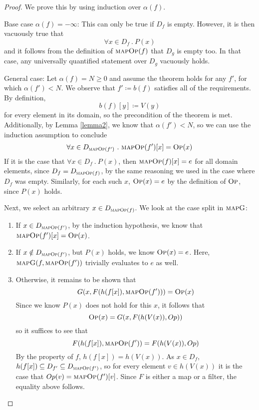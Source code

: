 \documentclass{article}
\newcommand{\iteDef}[4]{
  #1 \coloneqq \left\{
\begin{array}{ll}
      #2 &; #3 \\
      #4 &; \text{otherwise}\\
\end{array} 
\right. 
}
\newcommand{\op}{\textsc{Op}}
\newcommand{\mop}{\textsc{mapOp}}
\newcommand{\mapg}{\textsc{mapG}}
\begin{document}
\begin{proof}
We prove this by using induction over $\alpha(f)$.

Base case $\alpha(f) = -\infty$: This can only be true if $D_f$ is empty. However, it is then vacuously true that 
\[
\forall x \in D_f \ .\ P(x)
\]
and it follows from the definition of $\mop(f)$ that $D_g$ is empty too. In that case, any universally quantified statement over $D_g$ vacuously holds.

General case: Let $\alpha(f) = N \ge 0$ and assume the theorem holds for any $f'$, for which $\alpha(f') < N$.
We observe that $f' \coloneqq b(f)$ satisfies all of the requirements. By definition, 
\[
b(f)[y] \coloneqq V(y)
\]
for every element in its domain, so the precondition of the theorem is met. Additionally, by Lemma \ref{lemma2}, we know that $\alpha(f') < N$, so we can use the induction assumption to conclude 
\[
\forall x \in D_{\mop(f')} \ .\ \mop(f')[x] = \op(x)
\]
If it is the case that $\forall x \in D_f \ .\ P(x)$, then $\mop(f)[x] = e$ for all domain elements, since 
$D_f = D_{\mop(f)}$, by the same reasoning we used in the case where $D_f$ was empty. Similarly, for each such $x$, $\op(x) = e$ by the definition of $\op$, since $P(x)$ holds.

Next, we select an arbitrary $x \in D_{\mop(f)}$. We look at the case split in $\mapg$:
\begin{enumerate}
\item If $x \in D_{\mop(f')}$, by the induction hypothesis, we know that $\mop(f')[x] = \op(x)$.
\item If $x \notin D_{\mop(f')}$, but $P(x)$ holds, we know $\op(x) = e$. Here, $\mapg(f, \mop(f'))$ trivially evaluates to $e$ as well.
\item Otherwise, it remains to be shown that
\[
G(x, F(h(f[x]), \mop(f'))) = \op(x)
\]
Since we know $P(x)$ does not hold for this $x$, it follows that
\[
\op(x) = G(x, F(h(V(x)), Op))
\]
so it suffices to see that 
\[
F(h(f[x]), \mop(f')) = F(h(V(x)), Op)
\]
By the property of $f$, $h(f[x]) = h(V(x))$. As $x \in D_f$, $h(f[x]) \subseteq D_{f'} \subseteq D_{\mop(f')}$, so for every element $v \in h(V(x))$ it is the case that $Op(v) = \mop(f')[v]$. Since $F$ is either a map or a filter, the equality above follows.

\end{enumerate}

\end{proof}
\end{document}
